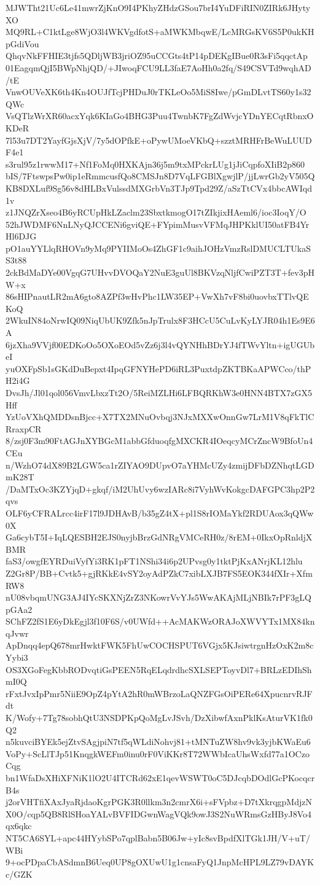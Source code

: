 MJWTht21Uc6Le41mwrZjKnO9I4PKhyZHdzGSou7brI4YuDFiRIN0ZIRk6JHytyXO
MQ9RL+C1ktLge8WjO3l4WKVgdfotS+aMWKMbqwE/LcMRGsKV6S5P0ukKHpGdiVou
QhqvNkFFHIE3tjfs5QDljWB3jriOZ95uCCGts4tP14pDEKgIBue0R3sFi5qqctAp
01EagqmQjI5BWpNhjQD/+JIwoqFCU9LL3faE7AoHh0a2fq/S49CSVTd9wqhAD/tE
VnwOUVeXK6th4Kn4OUJfTcjPHDuJ0rTKLeOo5MiS8Iwe/pGmDLvtTS60y1s32QWc
VsQTlzWrXR60acxYqk6KIaGo4BHG3Puu4TwnbK7FgZdWvjcYDnYECqtRbnxOKDeR
7l53u7DT2YayfGjsXjV/7y5dOPfkE+oPywUMoeVKbQ+szztMRHFrBeWuLUUDF4e1
s3rul95z1rwwM17+Nf1FoMq0HXKAjn36j5m9txMPckrLUg1jJiCqpfoXIiB2p860
bIS/7FtswpsPw0ip1eRmmcusfQo8CMSJn8D7VqLFGBlXgwjlP/jjLwrGb2yV505Q
KB8DXLuf9Sg56v8dHLBxVulssdMXGrbVn3TJp9Tpd29Z/aSzTtCVx4bbcAWIqd1v
z1JNQZrXseo4B6yRCUpHkLZaclm23SbxtkmogO17tZIkjixHAeml6/ioc3IoqY/O
52hJWDMF6NnLNyQJCCENi6gviQE+FYpimMusvVFMqJHPKklUI50atFB4YrHl6DJG
pO1auYYLlqRHOVn9yMq9PYIIMoOs4ZhGF1c9aihJOHzVmzRslDMUCLTUkaSS3t88
2ckBdMaDYe00VgqG7UHvvDVOQaY2NuE3guUl8BKVzqNljfCwiPZT3T+fev3pHW+x
86sHIPnautLR2mA6gto8AZPf3wHvPhc1LW35EP+VwXh7vF8bi0uovbxTTlvQEKoQ
2WkuIN84oNrwIQ09NiqUbUK9Zfk5nJpTrulx8F3HCcU5CuLvKyLYJR04h1Es9E6A
6jzXha9VVjf00EDKoOo5OXoEOd5vZz6j3l4vQYNHhBDrYJ4fTWvYltn+igUGUbeI
yuOXFpSb1sGKdDuBepxt4IpqGFNYHePD6iRL3PuxtdpZKTBKaAPWCco/thPH2i4G
DvsJh/Jl01qol056VmvLbxzTt2O/5ReiMZLHi6LFBQRKhW3e0HNN4BTX7zGX5Hff
YzUoVXhQMDDsnBjcc+X7TX2MNuOvbqj3NJxMXXwOnnGw7LrM1V8qFkTlCRraxpCR
8/zsj0F3m90FtAGJnXYBGcM1abbGfduoqfgMXCKR4IOeqcyMCrZncW9BfoUn4CEu
n/WzhO74dX89B2LGW5ca1rZIYAO9DUpvO7aYHMcUZy4zmijDFbDZNhqtLGDmK28T
/DaMTxOc3KZYjqD+gkqf/iM2UhUvy6wzIARc8i7VyhWvKokgcDAFGPC3hp2P2qvs
OLF6yCFRALrcc4irF17l9JDHAvB/b35gZ4tX+pl1S8rIOMaYkf2RDUAox3qQWw0X
Ga6cybT5I+IqLQESBH2EJS0nyjbBrzGdNRgVMCeRH0z/8rEM+0IkxOpRnldjXBMR
faS3/owgfEYRDuiVyfYi3RK1pFT1NShi34i6p2UPvsg0y1tktPjKxANrjKL12hlu
Z2Gr8P/BB+Cvtk5+gjRKkE4vSY2oyAdPZkC7xibLXJB7FS5EOK344fXIr+XfmRW8
nU08vbqmUNG3AJ4IYcSKXNjZrZ3NKowrVvYJs5WwAKAjMLjNBIk7rPF3gLQpGAa2
SChFZ2fS1E6yDkEgjl3f10F6S/v0UWfd++AcMAKWzORAJoXWVYTx1MX84knqJvwr
ApDnqq4epQ678mrHwktFWK5FhUwCOCHSPUT6VGjx5KJsiwtrgnHzOxK2m8cYybi3
OS3XGoFegKbbRODvqtiGsPEEN5RqELqdrdhcSXLSEPToyvDl7+BRLzEDIhShmI0Q
rFxtJvxIpPmr5NiiE9OpZ4pYtA2hR0mWBrzoLaQNZFGsOiPERe64XpucnrvRJFdt
K/Wofy+7Tg78sobhQtU3NSDPKpQoMgLvJSvh/DzXibwfAxnPklKsAturVK1fk0Q2
n5kuvciBYEk5ejZtvSAgjpiN7tf5qWLdiNohvj81+tMNTuZW8hv9vk3yjbKWaEu6
VoPy+ScLlTJp51KnqgkWEFm0inu0rF0ViKKr8T72WWbIcaUhsWxfd77a1OCzoCqg
bn1WfaDsXHiXFNiK1lO2U4ITCRd62xE1qevWSWT0oC5DJcqbDOdlGcPKocqcrB4s
j2orVHTfiXAxJyaRjdaoKgrPGK3R0llkm3n2cmrX6i+sFVpbz+D7tXkrqgpMdjzN
X0O/cqp5QB8RlSHoaYALvBVFIDGwnWagVQk9owJ3S2NuWRmsGzHByJ8Vo4qx6qkc
NT5CA6SYL+apc44HYybSPo7qplBabn5B06Jw+yIc8svBpdfXlTGk1JH/V+uT/WBi
9+ocPDpaCbASdmnB6Ueq0UP8gOXUwU1g1cnsaFyQ1JnpMcHPL9LZ79vDAYKc/GZK

